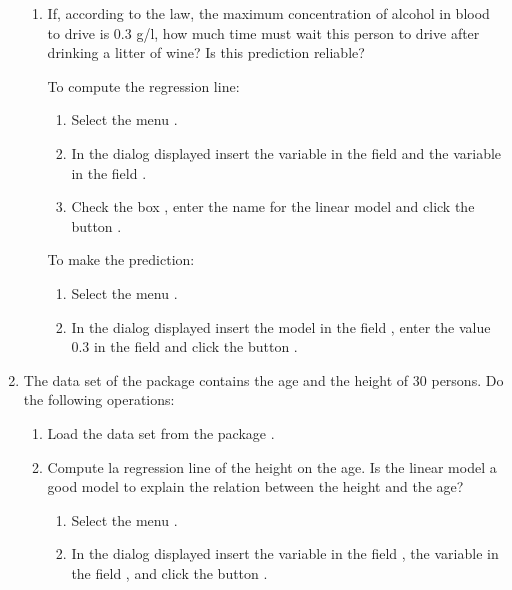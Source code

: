 \begin{enumerate}[leftmargin=*]
\begin{enumerate}
\item If, according to the law, the maximum concentration of alcohol in blood to drive is $0.3$ g/l, how much
time must wait this person to drive after drinking a litter of wine?
Is this prediction reliable?
\begin{indication}
To compute the regression line:
\begin{enumerate}
\item Select the menu .
\item In the dialog displayed insert the variable  in the field  and the
variable  in the field .
\item Check the box , enter the name  for the linear model
and click the button .
\end{enumerate}
To make the prediction:
\begin{enumerate}
\item Select the menu .
\item In the dialog displayed insert the model  in the field , enter the value 0.3 in the field  and click the button .
\end{enumerate}
\end{indication}
\end{enumerate}


\item The data set  of the package  contains the age and the height of 30
persons.
Do the following operations:
\begin{enumerate}
\item Load the data set  from the package .

\item Compute la regression line of the height on the age.
Is the linear model a good model to explain the relation between the height and the age?
\begin{indication}
\begin{enumerate}
\item Select the menu .
\item In the dialog displayed insert the variable  in the field , the
variable  in the field , and click the button .
\end{enumerate}
\end{indication}


\end{enumerate}
\end{enumerate}
